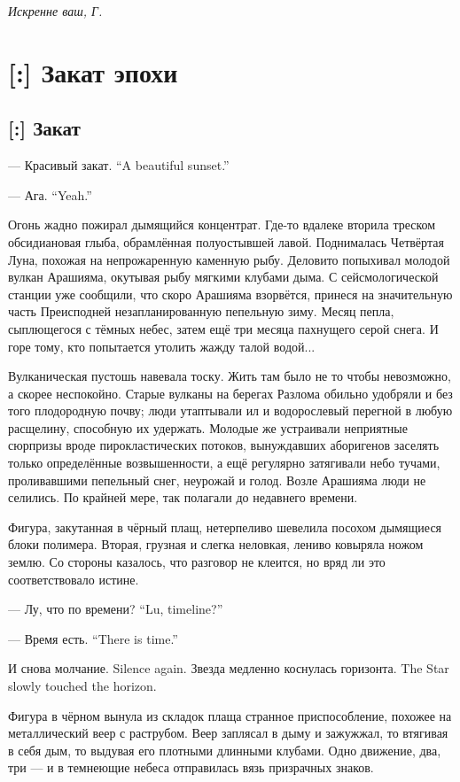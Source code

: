 \emph{Искренне ваш, Г.}

\chapter{[:] Закат эпохи}

\section{[:] Закат}

{--- Красивый закат.}
{``A beautiful sunset.''}

{--- Ага.}
{``Yeah.''}

Огонь жадно пожирал дымящийся концентрат.
Где-то вдалеке вторила треском обсидиановая глыба, обрамлённая полуостывшей лавой.
Поднималась Четвёртая Луна, похожая на непрожаренную каменную рыбу.
Деловито попыхивал молодой вулкан Арашияма, окутывая рыбу мягкими клубами дыма.
С сейсмологической станции уже сообщили, что скоро Арашияма взорвётся, принеся на значительную часть Преисподней незапланированную пепельную зиму.
Месяц пепла, сыплющегося с тёмных небес, затем ещё три месяца пахнущего серой снега.
И горе тому, кто попытается утолить жажду талой водой...

Вулканическая пустошь навевала тоску.
Жить там было не то чтобы невозможно, а скорее неспокойно.
Старые вулканы на берегах Разлома обильно удобряли и без того плодородную почву;
люди утаптывали ил и водорослевый перегной в любую расщелину, способную их удержать.
Молодые же устраивали неприятные сюрпризы вроде пирокластических потоков, вынуждавших аборигенов заселять только определённые возвышенности, а ещё регулярно затягивали небо тучами, проливавшими пепельный снег, неурожай и голод.
Возле Арашияма люди не селились.
По крайней мере, так полагали до недавнего времени.

Фигура, закутанная в чёрный плащ, нетерпеливо шевелила посохом дымящиеся блоки полимера.
Вторая, грузная и слегка неловкая, лениво ковыряла ножом землю.
Со стороны казалось, что разговор не клеится, но вряд ли это соответствовало истине.

{--- Лу, что по времени?}
{``Lu, timeline?''}

{--- Время есть.}
{``There is time.''}

{И снова молчание.}
{Silence again.}
{Звезда медленно коснулась горизонта.}
{The Star slowly touched the horizon.}

Фигура в чёрном вынула из складок плаща странное приспособление, похожее на металлический веер с раструбом.
Веер заплясал в дыму и зажужжал, то втягивая в себя дым, то выдувая его плотными длинными клубами.
Одно движение, два, три --- и в темнеющие небеса отправилась вязь призрачных знаков.

